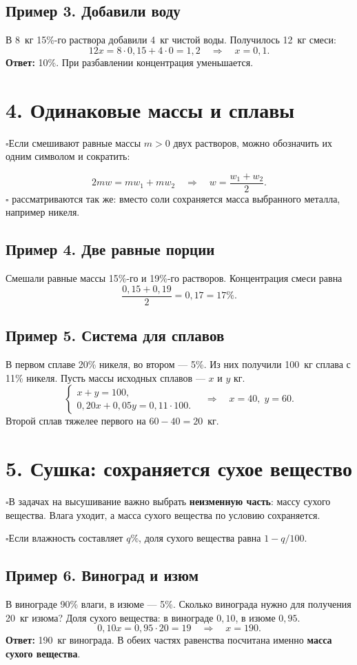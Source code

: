 \documentclass[a4paper,12pt]{article}
\newcommand{\checkitem}[1]{\noindent\(\square\)\enspace #1\par}
\newcommand{\keyterm}[1]{{\color{darkaccent}\textbf{#1}}}
\begin{document}
\subsection*{Пример 3. Добавили воду}
В 8~кг 15\%-го раствора добавили 4~кг чистой воды. Получилось 12~кг смеси:
\[
12x=8\cdot0{,}15+4\cdot0=1{,}2
\quad\Longrightarrow\quad x=0{,}1.
\]
\keyterm{Ответ:} 10\%. При разбавлении концентрация уменьшается.

\clearpage
\section*{4. Одинаковые массы и сплавы}
\checkitem{Если смешивают равные массы \(m>0\) двух растворов, можно обозначить их одним символом и сократить:}
\[
2mw=mw_1+mw_2\quad\Longrightarrow\quad
\boxed{w=\frac{w_1+w_2}{2}}.
\]
\checkitem{\keyterm{Сплавы} рассматриваются так же: вместо соли сохраняется масса выбранного металла, например никеля.}
\subsection*{Пример 4. Две равные порции}
Смешали равные массы 15\%-го и 19\%-го растворов. Концентрация смеси равна
\[
\frac{0{,}15+0{,}19}{2}=0{,}17=17\%.
\]
\subsection*{Пример 5. Система для сплавов}
В первом сплаве 20\% никеля, во втором --- 5\%. Из них получили 100~кг сплава с 11\% никеля. Пусть массы исходных сплавов --- \(x\) и \(y\) кг.
\[
\begin{cases}
x+y=100,\\
0{,}20x+0{,}05y=0{,}11\cdot100.
\end{cases}
\quad\Longrightarrow\quad x=40,\;y=60.
\]
Второй сплав тяжелее первого на \(60-40=20\)~кг.

\section*{5. Сушка: сохраняется сухое вещество}
\checkitem{В задачах на высушивание важно выбрать \keyterm{неизменную часть}: массу сухого вещества. Влага уходит, а масса сухого вещества по условию сохраняется.}
\checkitem{Если влажность составляет \(q\%\), доля сухого вещества равна \(1-q/100\).}
\subsection*{Пример 6. Виноград и изюм}
В винограде 90\% влаги, в изюме --- 5\%. Сколько винограда нужно для получения 20~кг изюма? Доля сухого вещества: в винограде \(0{,}10\), в изюме \(0{,}95\).
\[
0{,}10x=0{,}95\cdot20=19
\quad\Longrightarrow\quad x=190.
\]
\keyterm{Ответ:} 190~кг винограда. В обеих частях равенства посчитана именно \keyterm{масса сухого вещества}.
\end{document}
